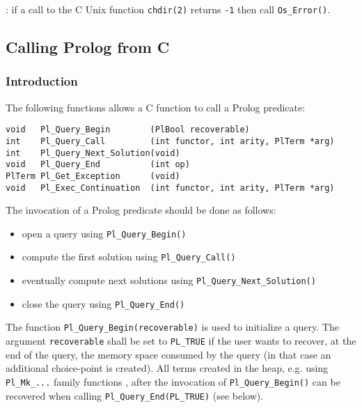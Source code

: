 : if a call to the C Unix function \texttt{chdir(2)} returns
\texttt{-1} then call \texttt{Os\_Error()}.


\subsection{Calling Prolog from C}

\subsubsection{Introduction}
The following functions allows a C function to call a Prolog predicate:

\begin{Indentation}
\begin{verbatim}
void   Pl_Query_Begin        (PlBool recoverable)
int    Pl_Query_Call         (int functor, int arity, PlTerm *arg)
int    Pl_Query_Next_Solution(void)
void   Pl_Query_End          (int op)
PlTerm Pl_Get_Exception      (void)
void   Pl_Exec_Continuation  (int functor, int arity, PlTerm *arg)
\end{verbatim}
\end{Indentation}

The invocation of a Prolog predicate should be done as follows:

\begin{itemize}

\item open a query using \texttt{Pl\_Query\_Begin()}

\item compute the first solution using \texttt{Pl\_Query\_Call()}

\item eventually compute next solutions using
\texttt{Pl\_Query\_Next\_Solution()}

\item close the query using \texttt{Pl\_Query\_End()}

\end{itemize}

The function \texttt{Pl\_Query\_Begin(recoverable)} is used to initialize a query. The argument \texttt{recoverable} shall be set to
\texttt{PL\_TRUE} if the user wants to recover, at the end of the query, the
memory space consumed by the query (in that case an additional choice-point
is created). All terms created in the heap, e.g. using \texttt{Pl\_Mk\_...}
family functions , after the invocation of
\texttt{Pl\_Query\_Begin()} can be recovered when calling
\texttt{Pl\_Query\_End(PL\_TRUE)} (see below).

